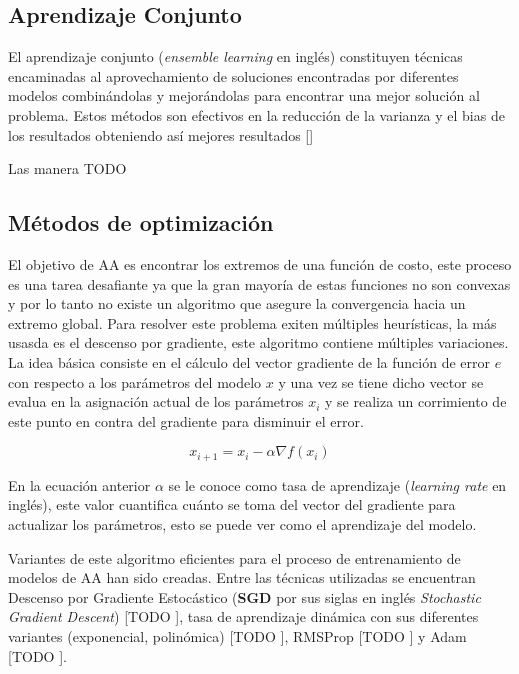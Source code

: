\subsection{Aprendizaje Conjunto}

El aprendizaje conjunto (\emph{ensemble learning} en inglés) constituyen técnicas encaminadas al aprovechamiento
de soluciones encontradas por diferentes modelos combinándolas y mejorándolas para encontrar una mejor solución 
al problema. Estos métodos son efectivos en la reducción de la varianza y el bias de los resultados obteniendo así
mejores resultados [\cite{dietterich2002ensemble}] 

Las manera TODO

\subsection{Métodos de optimización}


El objetivo de AA es encontrar los extremos de una función de costo, este proceso es una tarea 
desafiante ya que la gran mayoría de estas funciones no son convexas y por lo tanto no existe un algoritmo
que asegure la convergencia hacia un extremo global. Para resolver este problema exiten múltiples heurísticas,
la más usasda es el descenso por gradiente, este algoritmo contiene múltiples variaciones. La idea básica consiste 
en el cálculo del vector gradiente de la función de error $e$ con respecto a los parámetros del modelo $x$ y una vez se 
tiene dicho vector se evalua en la asignación actual de los parámetros $x_i$ y se realiza un corrimiento de este punto 
en contra del gradiente para disminuir el error.

\begin{equation}
	x_{i+1} = x_i - \alpha \nabla f(x_i)
\end{equation}\label{eq:gradien_descent}

En la ecuación anterior $\alpha$ se le conoce como tasa de aprendizaje (\emph{learning rate} en inglés),
este valor cuantifica cuánto se toma del vector del gradiente para actualizar los parámetros, esto 
se puede ver como el aprendizaje del modelo.

Variantes de este algoritmo eficientes para el proceso de entrenamiento de modelos de AA han sido 
creadas. Entre las técnicas utilizadas se encuentran Descenso por Gradiente Estocástico (\textbf{SGD} por sus siglas 
en inglés \emph{Stochastic Gradient Descent}) [TODO \cite{}], tasa de aprendizaje dinámica con sus diferentes
variantes (exponencial, polinómica) [TODO \cite{}], RMSProp [TODO \cite{}] y Adam [TODO \cite{}]. 

